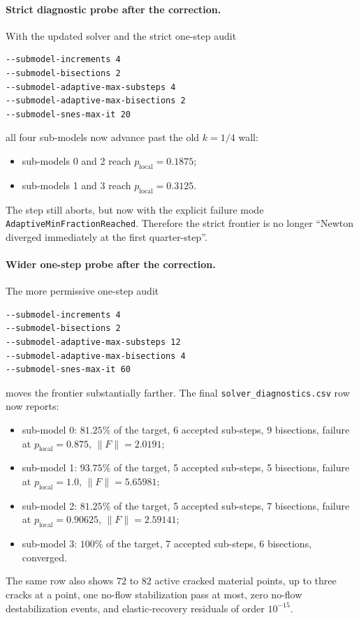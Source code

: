\paragraph{Strict diagnostic probe after the correction.}
With the updated solver and the strict one-step audit
\begin{verbatim}
--submodel-increments 4
--submodel-bisections 2
--submodel-adaptive-max-substeps 4
--submodel-adaptive-max-bisections 2
--submodel-snes-max-it 20
\end{verbatim}
all four sub-models now advance past the old \(k=1/4\) wall:
\begin{itemize}
  \item sub-models 0 and 2 reach \(p_{\mathrm{local}} = 0.1875\);
  \item sub-models 1 and 3 reach \(p_{\mathrm{local}} = 0.3125\).
\end{itemize}
The step still aborts, but now with the explicit failure mode
\texttt{AdaptiveMinFractionReached}.  Therefore the strict frontier is no
longer ``Newton diverged immediately at the first quarter-step''.

\paragraph{Wider one-step probe after the correction.}
The more permissive one-step audit
\begin{verbatim}
--submodel-increments 4
--submodel-bisections 2
--submodel-adaptive-max-substeps 12
--submodel-adaptive-max-bisections 4
--submodel-snes-max-it 60
\end{verbatim}
moves the frontier substantially farther.  The final
\texttt{solver\_diagnostics.csv} row now reports:
\begin{itemize}
  \item sub-model 0: \(81.25\%\) of the target, 6 accepted sub-steps,
    9 bisections, failure at \(p_{\mathrm{local}}=0.875\),
    \(\|F\| = 2.0191\);
  \item sub-model 1: \(93.75\%\) of the target, 5 accepted sub-steps,
    5 bisections, failure at \(p_{\mathrm{local}}=1.0\),
    \(\|F\| = 5.65981\);
  \item sub-model 2: \(81.25\%\) of the target, 5 accepted sub-steps,
    7 bisections, failure at \(p_{\mathrm{local}}=0.90625\),
    \(\|F\| = 2.59141\);
  \item sub-model 3: \(100\%\) of the target, 7 accepted sub-steps,
    6 bisections, converged.
\end{itemize}
The same row also shows \(72\) to \(82\) active cracked material points, up to
three cracks at a point, one no-flow stabilization pass at most, zero no-flow
destabilization events, and elastic-recovery residuals of order \(10^{-15}\).

